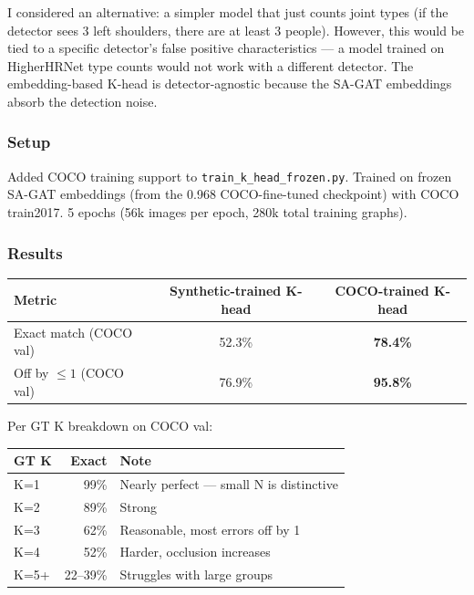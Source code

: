 I considered an alternative: a simpler model that just counts joint types (if the detector sees 3 left shoulders, there are at least 3 people). However, this would be tied to a specific detector's false positive characteristics --- a model trained on HigherHRNet type counts would not work with a different detector. The embedding-based K-head is detector-agnostic because the SA-GAT embeddings absorb the detection noise.

\subsubsection{Setup}

Added COCO training support to \texttt{train\_k\_head\_frozen.py}. Trained on frozen SA-GAT embeddings (from the 0.968 COCO-fine-tuned checkpoint) with COCO train2017. 5 epochs (56k images per epoch, 280k total training graphs).

\subsubsection{Results}

\begin{tabular}{lcc}
\hline
\textbf{Metric} & \textbf{Synthetic-trained K-head} & \textbf{COCO-trained K-head} \\
\hline
Exact match (COCO val) & 52.3\% & \textbf{78.4\%} \\
Off by $\leq 1$ (COCO val) & 76.9\% & \textbf{95.8\%} \\
\hline
\end{tabular}

\vspace{0.5em}

Per GT K breakdown on COCO val:

\begin{tabular}{lrl}
\hline
\textbf{GT K} & \textbf{Exact} & \textbf{Note} \\
\hline
K=1 & 99\% & Nearly perfect --- small N is distinctive \\
K=2 & 89\% & Strong \\
K=3 & 62\% & Reasonable, most errors off by 1 \\
K=4 & 52\% & Harder, occlusion increases \\
K=5+ & 22--39\% & Struggles with large groups \\
\hline
\end{tabular}

\vspace{0.5em}


